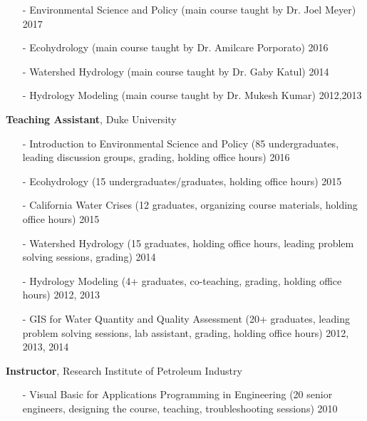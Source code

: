 \documentclass[10pt]{article}
\newenvironment{changemargin}[2]{%
  \begin{list}{}{%
    \setlength{\topsep}{0pt}%
    \setlength{\leftmargin}{#1}%
    \setlength{\rightmargin}{#2}%
    \setlength{\listparindent}{\parindent}%
    \setlength{\itemindent}{\parindent}%
    \setlength{\parsep}{\parskip}%
  }%
  \item[]}{\end{list}
}
\newenvironment{body} {
	\vspace*{-2pt}
	\begin{changemargin}{-0.5in}{-0.5in}
  }
	{\end{changemargin}
}
\begin{document}
\begin{body}
\begin{itemize}
		  \item[-]Environmental Science and Policy (main course taught by Dr. Joel Meyer)  \hfill {2017}
  		\item[-]Ecohydrology (main course taught by Dr. Amilcare Porporato)  \hfill {2016}
  		\item[-]Watershed Hydrology (main course taught by Dr. Gaby Katul)  \hfill {2014}
  		\item[-]Hydrology Modeling (main course taught by Dr. Mukesh Kumar)  \hfill {2012,2013}
  	\end{itemize}
\medskip


  \textbf {Teaching Assistant}, Duke University\\
	\vspace*{-4pt}
		\begin{itemize} \itemsep -0pt
  		\item[-]Introduction to Environmental Science and Policy (85 undergraduates, leading discussion groups, grading, holding office hours) \hfill {2016}
  		\item[-]Ecohydrology (15 undergraduates/graduates, holding office hours) \hfill {2015}
  		\item[-]California Water Crises (12 graduates, organizing course materials, holding office hours) \hfill {2015}
  		\item[-]Watershed Hydrology (15 graduates, holding office hours, leading problem solving sessions, grading) \hfill {2014}
  		\item[-]Hydrology Modeling (4+ graduates, co-teaching, grading, holding office hours) \hfill {2012, 2013}
  		\item[-]GIS for Water Quantity and Quality Assessment (20+ graduates, leading problem solving sessions, lab assistant, grading, holding office hours) \hfill {2012, 2013, 2014}
  	\end{itemize}

\medskip

	\textbf {Instructor}, Research Institute of Petroleum Industry\\
	\vspace*{-4pt}
			\begin{itemize} \itemsep -0pt
    	  \item[-]Visual Basic for Applications Programming in Engineering (20 senior engineers, designing the course, teaching,  troubleshooting sessions)  \hfill {2010}
    	\end{itemize}
\medskip


\end{body}
\end{document}
